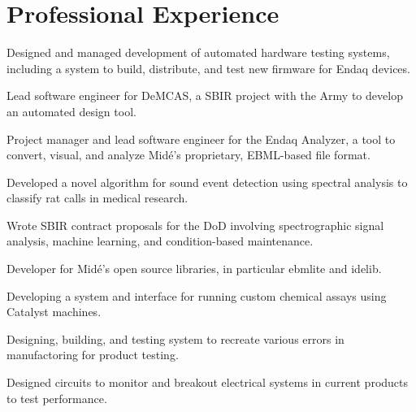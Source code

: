 \documentclass[letterpaper]{deedy-resume} %
\begin{document}
%
\begin{minipage}[t]{0.66\textwidth} %


\section{Professional Experience}


\vspace{\topsep} %
\begin{tightitemize}
\item Designed and managed development of automated hardware testing systems, including a system to build, distribute, and test new firmware for Endaq devices.
\item Lead software engineer for DeMCAS, a SBIR project with the Army to develop an automated design tool.
\item Project manager and lead software engineer for the Endaq Analyzer, a tool to convert, visual, and analyze Midé's proprietary, EBML-based file format.
\item Developed a novel algorithm for sound event detection using spectral analysis to classify rat calls in medical research.
\item Wrote SBIR contract proposals for the DoD involving spectrographic signal analysis, machine learning, and condition-based maintenance.
\item Developer for Midé's open source libraries, in particular ebmlite and idelib.
\end{tightitemize}

\sectionspace %



\begin{tightitemize}
\item Developing a system and interface for running custom chemical assays using Catalyst machines.
\item Designing, building, and testing system to recreate various errors in manufactoring for product testing.
\item Designed circuits to monitor and breakout electrical systems in current products to test performance.
\end{tightitemize}


\end{minipage}
\end{document}
